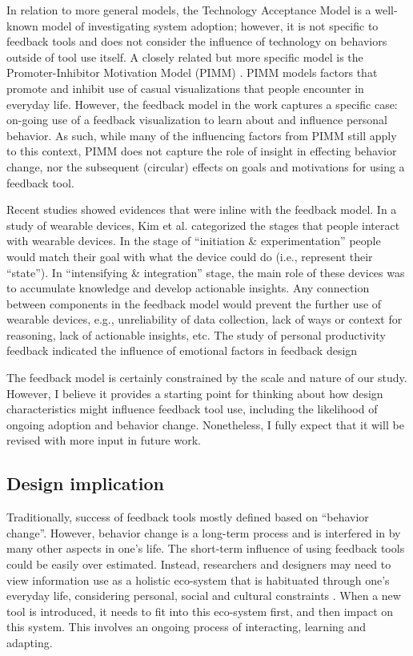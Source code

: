 \documentclass[12pt,oneside]{book}
\begin{document}
In relation to more general models, the Technology Acceptance Model \cite{bajaj_feedback_1998} is a well-known model of investigating system adoption; however, it is not specific to feedback tools and does not consider the influence of technology on behaviors outside of tool use itself. A closely related but more specific model is the Promoter-Inhibitor Motivation Model (PIMM) \cite{sprague_exploring_2012}. PIMM models factors that promote and inhibit use of casual visualizations that people encounter in everyday life. However, the feedback model in the work captures a specific case: on-going use of a feedback visualization to learn about and influence personal behavior. As such, while many of the influencing factors from PIMM still apply to this context, PIMM does not capture the role of insight in effecting behavior change, nor the subsequent (circular) effects on goals and motivations for using a feedback tool.

Recent studies showed evidences that were inline with the feedback model. In a study of wearable devices, Kim et al. \cite{kim_design_2016} categorized the stages that people interact with wearable devices. In the stage of ``initiation \& experimentation'' people would match their goal with what the device could do (i.e., represent their ``state''). In ``intensifying \& integration'' stage, the main role of these devices was to accumulate knowledge and develop actionable insights. Any connection between components in the feedback model would prevent the further use of wearable devices, e.g., unreliability of data collection, lack of ways or context for reasoning, lack of actionable insights, etc. The study of personal productivity feedback indicated the influence of emotional factors in feedback design \cite{kim_timeaware:_2016}

The feedback model is certainly constrained by the scale and nature of our study. However, I believe it provides a starting point for thinking about how design characteristics might influence feedback tool use, including the likelihood of ongoing adoption and behavior change. Nonetheless, I fully expect that it will be revised with more input in future work.

\subsection{Design implication}
Traditionally, success of feedback tools mostly defined based on ``behavior change''. However, behavior change is a long-term process and is interfered in by many other aspects in one's life. The short-term influence of using feedback tools could be easily over estimated. Instead, researchers and designers may need to view information use as a holistic eco-system that is habituated through one's everyday life, considering personal, social and cultural constraints \cite{strengers_designing_2011}. When a new tool is introduced, it needs to fit into this eco-system first, and then impact on this system. This involves an ongoing process of interacting, learning and adapting. 
\end{document}
